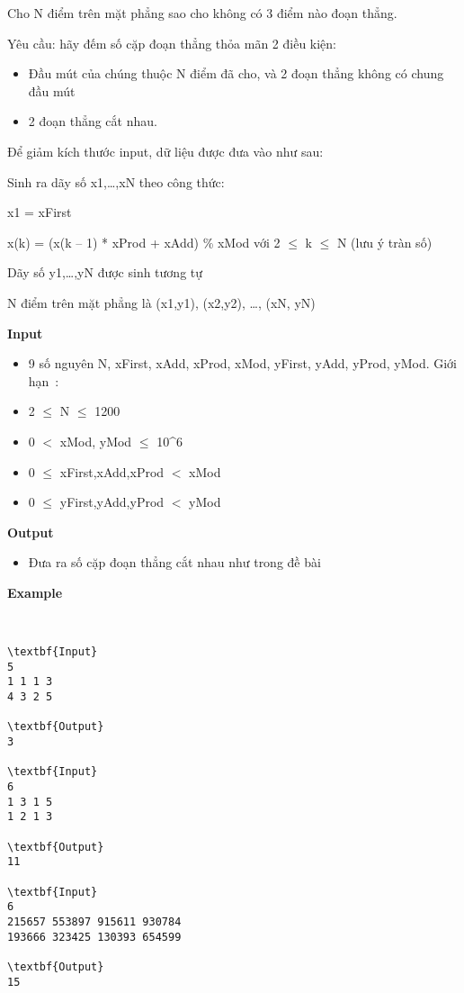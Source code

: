 

Cho N điểm trên mặt phẳng sao cho không có 3 điểm nào đoạn thẳng.

Yêu cầu: hãy đếm số cặp đoạn thẳng thỏa mãn 2 điều kiện:
\begin{itemize}
	\item 

Đầu mút của chúng thuộc N điểm đã cho, và 2 đoạn thẳng không có chung đầu mút
	\item 

2 đoạn thẳng cắt nhau.
\end{itemize}

Để giảm kích thước input, dữ liệu được đưa vào như sau:

Sinh ra dãy số x1,…,xN theo công thức:

x1 = xFirst

x(k) = (x(k – 1) * xProd + xAdd) \% xMod với 2  $\le$  k  $\le$  N (lưu ý tràn số)

Dãy số y1,…,yN được sinh tương tự

N điểm trên mặt phẳng là (x1,y1), (x2,y2), …, (xN, yN)

\textbf{Input}
\begin{itemize}
	\item 

9 số nguyên N, xFirst, xAdd, xProd, xMod, yFirst, yAdd, yProd, yMod. Giới hạn :
	\item 

2  $\le$  N  $\le$  1200
	\item 

0 $<$ xMod, yMod  $\le$  10\textasciicircum6
	\item 

0  $\le$  xFirst,xAdd,xProd $<$ xMod
	\item 

0  $\le$  yFirst,yAdd,yProd $<$ yMod
\end{itemize}

\textbf{Output}
\begin{itemize}
	\item 

Đưa ra số cặp đoạn thẳng cắt nhau như trong đề bài
\end{itemize}

\textbf{Example}

 
\begin{verbatim}
\textbf{Input}
5
1 1 1 3
4 3 2 5

\textbf{Output}
3

\textbf{Input}
6
1 3 1 5
1 2 1 3

\textbf{Output}
11

\textbf{Input}
6
215657 553897 915611 930784
193666 323425 130393 654599

\textbf{Output}
15\end{verbatim}
